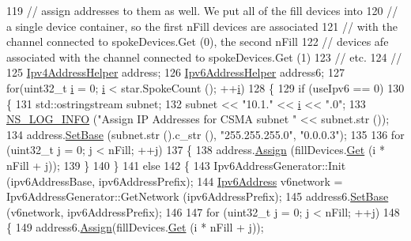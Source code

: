 \begin{DoxyCode}
119   \textcolor{comment}{// assign addresses to them as well.  We put all of the fill devices into}
120   \textcolor{comment}{// a single device container, so the first nFill devices are associated}
121   \textcolor{comment}{// with the channel connected to spokeDevices.Get (0), the second nFill}
122   \textcolor{comment}{// devices afe associated with the channel connected to spokeDevices.Get (1)}
123   \textcolor{comment}{// etc.}
124   \textcolor{comment}{//}
125   \hyperlink{classns3_1_1Ipv4AddressHelper}{Ipv4AddressHelper} address;
126   \hyperlink{classns3_1_1Ipv6AddressHelper}{Ipv6AddressHelper} address6;
127   \textcolor{keywordflow}{for}(uint32\_t \hyperlink{bernuolliDistribution_8m_a6f6ccfcf58b31cb6412107d9d5281426}{i} = 0; \hyperlink{bernuolliDistribution_8m_a6f6ccfcf58b31cb6412107d9d5281426}{i} < star.SpokeCount (); ++\hyperlink{bernuolliDistribution_8m_a6f6ccfcf58b31cb6412107d9d5281426}{i})
128     \{
129       \textcolor{keywordflow}{if} (useIpv6 == 0)
130         \{
131           std::ostringstream subnet;
132           subnet << \textcolor{stringliteral}{"10.1."} << \hyperlink{bernuolliDistribution_8m_a6f6ccfcf58b31cb6412107d9d5281426}{i} << \textcolor{stringliteral}{".0"};
133           \hyperlink{group__logging_gafbd73ee2cf9f26b319f49086d8e860fb}{NS\_LOG\_INFO} (\textcolor{stringliteral}{"Assign IP Addresses for CSMA subnet "} << subnet.str ());
134           address.\hyperlink{classns3_1_1Ipv4AddressHelper_acf7b16dd25bac67e00f5e25f90a9a035}{SetBase} (subnet.str ().c\_str (), \textcolor{stringliteral}{"255.255.255.0"}, \textcolor{stringliteral}{"0.0.0.3"});
135 
136           \textcolor{keywordflow}{for} (uint32\_t j = 0; j < nFill; ++j)
137             \{
138               address.\hyperlink{classns3_1_1Ipv4AddressHelper_af8e7f4a1a7e74c00014a1eac445a27af}{Assign} (fillDevices.\hyperlink{classns3_1_1NetDeviceContainer_a677d62594b5c9d2dea155cc5045f4d0b}{Get} (i * nFill + j));
139             \}
140         \}
141       \textcolor{keywordflow}{else}
142         \{
143           Ipv6AddressGenerator::Init (ipv6AddressBase, ipv6AddressPrefix);
144           \hyperlink{classns3_1_1Ipv6Address}{Ipv6Address} v6network = Ipv6AddressGenerator::GetNetwork (ipv6AddressPrefix);
145           address6.\hyperlink{classns3_1_1Ipv6AddressHelper_a13467412e9da6263395c09460681c0f1}{SetBase} (v6network, ipv6AddressPrefix);
146 
147           \textcolor{keywordflow}{for} (uint32\_t j = 0; j < nFill; ++j)
148             \{
149               address6.\hyperlink{classns3_1_1Ipv6AddressHelper_aad4685588aea1757beaf881bc4157912}{Assign}(fillDevices.\hyperlink{classns3_1_1NetDeviceContainer_a677d62594b5c9d2dea155cc5045f4d0b}{Get} (i * nFill + j));

\end{DoxyCode}
